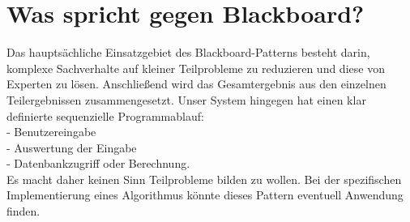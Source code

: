 \section*{Was spricht gegen Blackboard?}
Das hauptsächliche Einsatzgebiet des Blackboard-Patterns besteht darin, komplexe Sachverhalte auf kleiner Teilprobleme zu reduzieren und diese von Experten zu lösen. Anschließend wird das Gesamtergebnis aus den einzelnen Teilergebnissen zusammengesetzt. 
Unser System hingegen hat einen klar definierte sequenzielle Programmablauf: \\
- Benutzereingabe\\
- Auswertung der Eingabe\\
- Datenbankzugriff oder Berechnung.\\
Es macht daher keinen Sinn Teilprobleme bilden zu wollen. Bei der spezifischen Implementierung eines Algorithmus könnte dieses Pattern eventuell Anwendung finden.